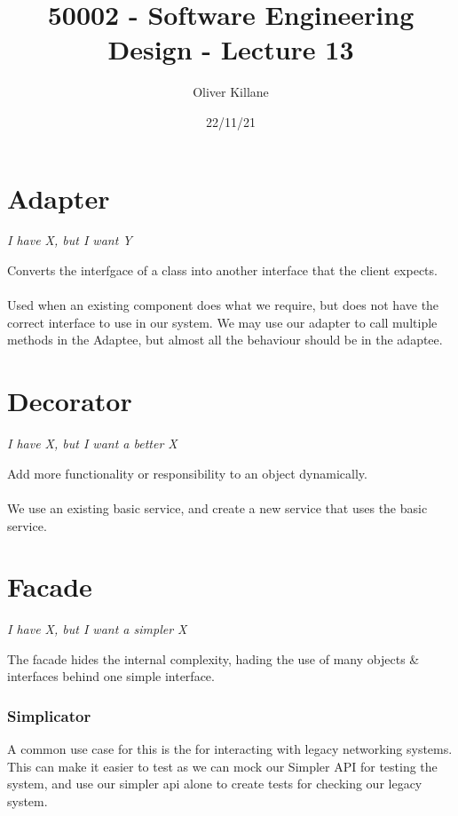 \documentclass{report}
\title{50002 - Software Engineering Design - Lecture 13}
\author{Oliver Killane}
\date{22/11/21}
\begin{document}
\maketitle
{}

\section*{Adapter}
\centerline{\textit{I have X, but I want Y}}
Converts the interfgace of a class into another interface that the client expects.
\\
\\ Used when an existing component does what we require, but does not have the correct interface to use in our system. We may use our adapter to call multiple methods in the Adaptee, but almost all the behaviour should be in the adaptee.

\section*{Decorator}
\centerline{\textit{I have X, but I want a better X}}
Add more functionality or responsibility to an object dynamically.
\\
\\ We use an existing basic service, and create a new service that uses the basic service.

\section*{Facade}
\centerline{\textit{I have X, but I want a simpler X}}
The facade hides the internal complexity, hading the use of many objects \& interfaces  behind one simple interface.
\subsubsection*{Simplicator}
A common use case for this is the  for interacting with legacy networking systems.
This can make it easier to test as we can mock our Simpler API for testing the system, and use our simpler api alone to create tests for checking our legacy system.
\end{document}
